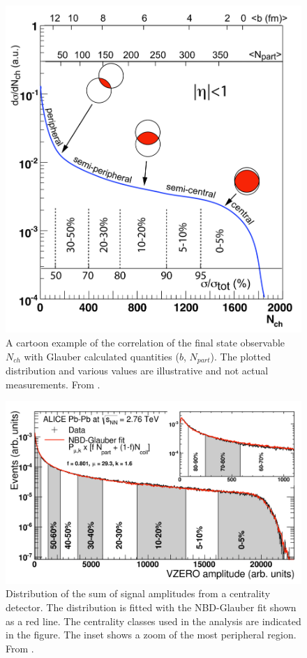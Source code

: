 \begin{figure}[!t]
\begin{center}
\includegraphics[width=0.75\linewidth]{Chapters/Analysis/Figs/glauber-centrality.pdf}
\caption{A cartoon example of the correlation of the final state observable $N_{ch}$ with Glauber calculated quantities ($b$, $N_{part}$). The plotted distribution and various values are illustrative and not actual measurements. From \cite{Miller:2007ri}.}
\label{fig:GlauberCent}
\end{center}
\end{figure}

\begin{figure}[!t]
\begin{center}
\includegraphics[width=0.85\linewidth]{Chapters/Analysis/Figs/glauber-vzero.pdf}
\caption{Distribution of the sum of signal amplitudes from a centrality detector. The distribution is fitted with the NBD-Glauber fit shown as a red line. The centrality classes used in the analysis are indicated in the figure. The inset shows a zoom of the most peripheral region. From \cite{Abelev:2013qoq}.}
\label{fig:GlauberVZERO}
\end{center}
\end{figure}

